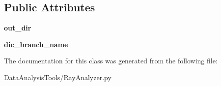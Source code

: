 \subsection*{Public Attributes}
\begin{DoxyCompactItemize}
\item 
\mbox{\label{classMIS_1_1DataAnalysisTools_1_1RayAnalyzer_1_1RayAnalyzer_ac2391116d64c6dfb45de5c62eccb49c1}} 
{\bfseries out\+\_\+dir}
\item 
\mbox{\label{classMIS_1_1DataAnalysisTools_1_1RayAnalyzer_1_1RayAnalyzer_a449a680f625ed64644b8abac1564780c}} 
{\bfseries dic\+\_\+branch\+\_\+name}
\end{DoxyCompactItemize}


The documentation for this class was generated from the following file\+:\begin{DoxyCompactItemize}
\item 
Data\+Analysis\+Tools/Ray\+Analyzer.\+py\end{DoxyCompactItemize}
